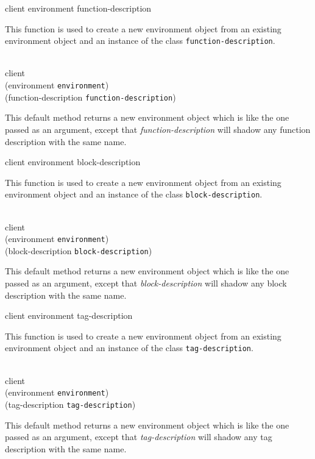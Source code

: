 {\footnotesize
{} {client environment function-description}
}

This function is used to create a new environment object from an
existing environment object and an instance of the class
\texttt{function-description}.

{\footnotesize
{}\\
           {client\\
            (environment {\tt environment})\\
            (function-description {\tt function-description})}
}

This default method returns a new environment object which is like the
one passed as an argument, except that \textit{function-description}
will shadow any function description with the same name.

{\footnotesize
{}
            {client environment block-description}
}

This function is used to create a new environment object from an
existing environment object and an instance of the class
\texttt{block-description}.

{\footnotesize
{}\\
           {client\\
            (environment {\tt environment})\\
            (block-description {\tt block-description})}
}

This default method returns a new environment object which is like the
one passed as an argument, except that \textit{block-description}
will shadow any block description with the same name.

{\footnotesize
{}
            {client environment tag-description}
}

This function is used to create a new environment object from an
existing environment object and an instance of the class
\texttt{tag-description}.

{\footnotesize
{}\\
           {client\\
            (environment {\tt environment})\\
            (tag-description {\tt tag-description})}
}

This default method returns a new environment object which is like the
one passed as an argument, except that \textit{tag-description}
will shadow any tag description with the same name.

